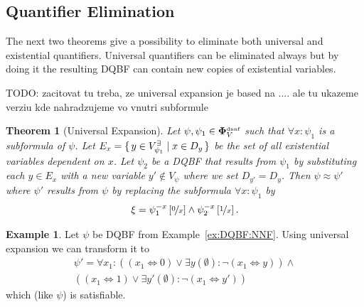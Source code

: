 \documentclass[
  digital, %
  twoside, %
  table,   %
  nolof,     %
  nolot,     %
]{fithesis3}
\let\setbuilder\set
\newcommand{\simpleset}[1]{\{{#1}\}}
\renewcommand{\set}[1]{\normalexpandarg\IfSubStr{#1}{|}{\setbuilder{#1}}{\simpleset{#1}}}
\newtheorem{theorem}{Theorem}[chapter] %
\theoremstyle{definition}
\newtheorem{example}{Example}
\theoremstyle{remark}
\newcommand{\substitute}[2]{\left[ \nicefrac{#2}{#1} \right]}
\newcommand{\DQBF}[1]{\mathbf{\Phi}_{#1}^{\text{\tiny dnnf}}}
\newcommand{\evars}[1]{V_{#1}^{\exists}}
\newcommand{\lequal}{\Leftrightarrow}
\begin{document}
\subsection{Quantifier Elimination}
The next two theorems give a possibility to eliminate both universal and existential quantifiers. Universal quantifiers can be eliminated always but by doing it the resulting DQBF can contain new copies of existential variables.

TODO: zacitovat tu treba, ze universal expansion je based na .... ale tu ukazeme verziu kde nahradzujeme vo vnutri subformule

\begin{theorem}[Universal Expansion]
\label{thrm:unExpan}
  Let $\psi, \psi_1 \in \DQBF{V}$ such that $\forall x : \psi_1$ is a subformula of $\psi$. Let $E_{x} = \set{y \in \evars{\psi_1} | x \in D_y}$ be the set of all existential variables dependent on $x$. Let $\psi_2$ be a DQBF that results from $\psi_1$ by substituting each $y \in E_x$ with a new variable $y' \not\in V_{\psi}$ where we set $D_{y'} = D_y$. Then $\psi \approx \psi'$ where $\psi'$ results from $\psi$ by replacing the subformula $\forall x : \psi_1$ by 
  \[\xi = \psi_1^{-x}\substitute{x}{0} \land \psi_2^{-x}\substitute{x}{1}.\]
\end{theorem}
\begin{example}
Let $\psi$ be DQBF from Example~\ref{ex:DQBF:NNF}. Using universal expansion we can transform it to
\begin{multline*}
    \psi' = \forall x_1 : ((x_1 \lequal 0) \lor \exists y (\emptyset) : \neg(x_1 \lequal y)) \land\\
    ((x_1 \lequal 1) \lor \exists y' (\emptyset) : \neg(x_1 \lequal y'))
\end{multline*}
which (like $\psi$) is satisfiable.
\end{example}
\end{document}
